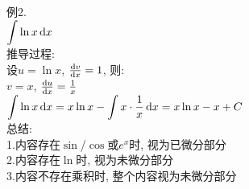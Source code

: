 例2.\\[1ex]
$\displaystyle\int\ln x\mathop{}\!\mathrm{d} x$\\[1ex]
推导过程:\\[1ex]
设$u=\ln x$, $\frac{\mathop{}\!\mathrm{d} v}{\mathop{}\!\mathrm{d} x}=1$, 则:\\[1ex]
\phantom{设}$v=x$, $\frac{\mathop{}\!\mathrm{d} u}{\mathop{}\!\mathrm{d} x}=\frac{1}{x}$\\[1ex]
$\displaystyle\int\ln x\mathop{}\!\mathrm{d} x=x\ln x-\int x\cdot\frac{1}{x}\mathop{}\!\mathrm{d} x=x\ln x-x+C$\\[1ex]
总结:\\[1ex]
1.内容存在$\sin$/$\cos$或$e^x$时, 视为已微分部分\\[1ex]
2.内容存在$\ln$时, 视为未微分部分\\[1ex]
3.内容不存在乘积时, 整个内容视为未微分部分\\[70ex]

